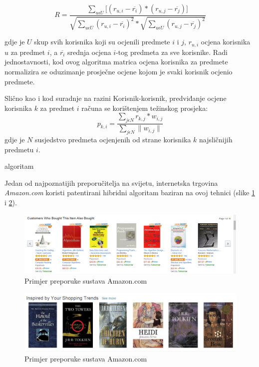 \documentclass[times, utf8, diplomski, numeric]{fer}
\begin{document}
\begin{equation}
\label{eq:pearsonPredmet}
	R = \frac
			{\sum_{u \epsilon U} 
				\big[
					(r_{u,i} - \overline{r_i}) \ast
					(r_{u,j} - \overline{r_j})
				\big]
			}
			{
				\sqrt{{\sum_{u \epsilon U} (r_{u,i} - \overline{r_i})^2}} \ast 
				\sqrt{{\sum_{u \epsilon U} (r_{u,j} - \overline{r_j})^2}}
			}
\end{equation}

gdje je $U$ skup svih korisnika koji su ocjenili predmete $i$ i $j$, $r_{u,i}$
ocjena korisnika $u$ za predmet $i$, a $\overline{r_i}$ srednja ocjena $i$-tog
predmeta za sve korisnike. Radi jednostavnosti, kod ovog algoritma matrica
ocjena korisnika za predmete normalizira se oduzimanje prosječne ocjene
kojom je svaki korisnik ocjenio predmete. 

Slično kao i kod suradnje na razini Korisnik-korisnik, predviđanje ocjene
korisnika $k$ za predmet $i$ računa se korištenjem težinskog prosjeka:
\begin{equation}
\label{eq:tezinskiProsjek}
	p_{k,i} = 
		\frac
			{\sum_{j \epsilon N} r_{k,j} \ast w_{i,j}}
			{\sum_{j \epsilon N} \|w_{i,j}\|}
\end{equation}
gdje je $N$ susjedstvo predmeta ocjenjenih od strane korisnika $k$ najsličnijih
predmetu $i$.

algoritam

Jedan od najpoznatijih preporučitelja na svijetu, internetska
trgovina \emph{Amazon.com} koristi patentirani hibridni algoritam baziran na
ovoj tehnici (slike \ref{fig:amazon1} i \ref{fig:amazon2}).
\begin{figure}[!htb]
	\centering
	\includegraphics[width=14.21cm]{images/collaborative/amazon.png}
	\caption{Primjer preporuke sustava \glqq Amazon.com\grqq}
	\label{fig:amazon1}
\end{figure}

\begin{figure}[!htb]
	\centering
	\includegraphics[width=14.21cm]{images/collaborative/amazon2.png}
	\caption{Primjer preporuke sustava \glqq Amazon.com\grqq}
	\label{fig:amazon2}
\end{figure}
\end{document}
